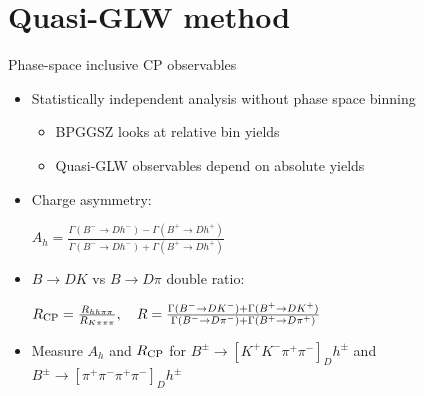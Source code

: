 \documentclass{beamer}
\begin{document}
\section{Quasi-GLW method}

\begin{frame}{Phase-space inclusive CP observables}
  \begin{itemize}
    \setlength\itemsep{0.5em}
    \item{Statistically independent analysis without phase space binning}
    \begin{itemize}
      \item{BPGGSZ looks at relative bin yields}
      \item{Quasi-GLW observables depend on absolute yields}
    \end{itemize}
    \item{Charge asymmetry:}
    \begin{center}
      $A_h = \frac{\Gamma(B^-\to D h^-) - \Gamma(B^+\to D h^+)}{\Gamma(B^-\to D h^-) + \Gamma(B^+\to D h^+)}$
    \end{center}
    \item{$B\to DK$ vs $B\to D\pi$ double ratio:}
    \begin{center}
      $R_{\rm CP} = \frac{R_{hh\pi\pi}}{R_{K\pi\pi\pi}}, \quad R = \frac{\Gamma(B^-\to D K^-) + \Gamma(B^+\to D K^+)}{\Gamma(B^-\to D\pi^-) + \Gamma(B^+\to D\pi^+)}$
    \end{center}
    \item{Measure $A_h$ and $R_{\rm CP}$ for $B^\pm\to[K^+K^-\pi^+\pi^-]_Dh^\pm$ and $B^\pm\to[\pi^+\pi^-\pi^+\pi^-]_Dh^\pm$}
  \end{itemize}
\end{frame}
\end{document}
